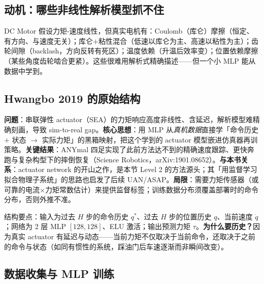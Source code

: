 \subsection{动机：哪些非线性解析模型抓不住}
\label{sec:rlmc-act-net-why}

DC Motor 假设力矩-速度线性，但真实电机有：Coulomb（库仑）摩擦（恒定、有方向、与速度无关）；库仑$+$粘性混合（低速以库仑为主、高速以粘性为主）；齿轮间隙（backlash，方向反转有死区）；温度依赖（升温后效率变）；位置依赖摩擦（某些角度齿轮啮合更紧）。这些很难用解析式精确描述——但一个小 MLP 能从数据中学到。

\subsection{Hwangbo 2019 的原始结构}
\label{sec:rlmc-act-net-hwangbo}

\begin{paper}\label{paper:rlmc-act-hwangbo}
\textbf{问题}：串联弹性 actuator（SEA）的力矩响应高度非线性、含延迟，解析模型难精确刻画，导致 sim-to-real gap。\textbf{核心思想}：用 MLP 从\emph{真机数据}直接学「命令历史 $+$ 状态 $\to$ 实际力矩」的黑箱映射，把这个学到的 actuator 模型嵌进仿真器再训策略。\textbf{关键结果}：ANYmal 四足实现了此前方法达不到的精确速度跟踪、更快奔跑与复杂构型下的摔倒恢复（Science Robotics，arXiv:1901.08652）\cite{hwangbo2019}。\textbf{与本书关系}：actuator network 的开山之作，是本节 Level 2 的方法源头；其「用监督学习拟合物理子系统」的思路也启发了后续 UAN/ASAP。\textbf{局限}：需要力矩传感器（或可靠的电流$\times$力矩常数估计）来提供监督标签；训练数据分布须覆盖部署时的命令分布，否则外推不准。
\end{paper}

结构要点：输入为过去 $H$ 步的命令历史 $q^*$、过去 $H$ 步的位置历史 $q$、当前速度 $\dot q$；网络为 2 层 MLP $[128,128]$、ELU 激活；输出预测力矩 $\tau$。\textbf{为什么要历史？}因为真实 actuator 有延迟与动态——当前力矩不仅取决于当前命令，还取决于之前的命令与状态（如同有惯性的系统，踩油门后车速逐渐而非瞬间改变）。

\subsection{数据收集与 MLP 训练}
\label{sec:rlmc-act-net-train}

